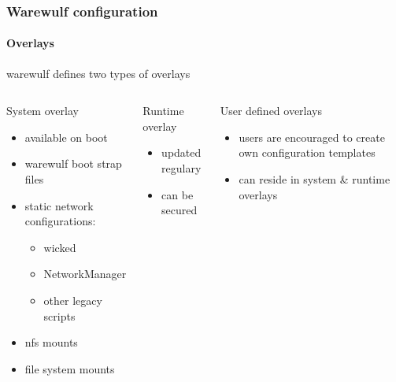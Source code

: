 \documentclass[aspectratio=169]{beamer}
\begin{document}
\begin{frame}[fragile]
\frametitle{Warewulf configuration}
\framesubtitle{Overlays}
warewulf defines two types of overlays
\begin{columns}
\begin{block}{System overlay}
\begin{itemize}
  \item available on boot
  \item warewulf boot strap files
  \item static network configurations:
  \begin{itemize}
    \item wicked
    \item NetworkManager
    \item other legacy scripts
  \end{itemize}
  \item nfs mounts
  \item file system mounts
\end{itemize}
\end{block}
\begin{block}{Runtime overlay}
\begin{itemize}
  \item updated regulary 
  \item can be secured
\end{itemize}
\end{block}
\begin{block}{User defined overlays}
\begin{itemize}
  \item users are encouraged to create own configuration templates
  \item can reside in system \& runtime overlays
\end{itemize}
\end{block}
\end{columns}
\end{frame}
\end{document}
